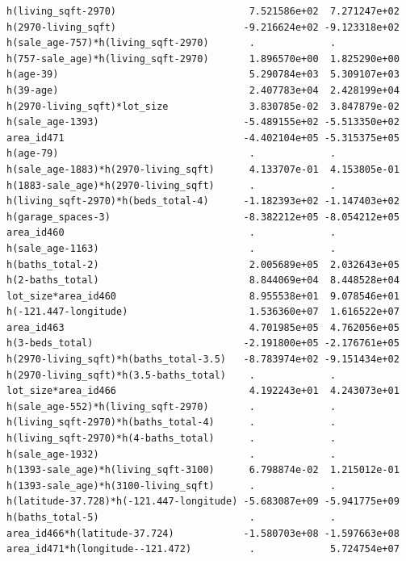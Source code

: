 \documentclass[
]{article}
\begin{document}
\begin{verbatim}
h(living_sqft-2970)                       7.521586e+02  7.271247e+02
h(2970-living_sqft)                      -9.216624e+02 -9.123318e+02
h(sale_age-757)*h(living_sqft-2970)       .             .           
h(757-sale_age)*h(living_sqft-2970)       1.896570e+00  1.825290e+00
h(age-39)                                 5.290784e+03  5.309107e+03
h(39-age)                                 2.407783e+04  2.428199e+04
h(2970-living_sqft)*lot_size              3.830785e-02  3.847879e-02
h(sale_age-1393)                         -5.489155e+02 -5.513350e+02
area_id471                               -4.402104e+05 -5.315375e+05
h(age-79)                                 .             .           
h(sale_age-1883)*h(2970-living_sqft)      4.133707e-01  4.153805e-01
h(1883-sale_age)*h(2970-living_sqft)      .             .           
h(living_sqft-2970)*h(beds_total-4)      -1.182393e+02 -1.147403e+02
h(garage_spaces-3)                       -8.382212e+05 -8.054212e+05
area_id460                                .             .           
h(sale_age-1163)                          .             .           
h(baths_total-2)                          2.005689e+05  2.032643e+05
h(2-baths_total)                          8.844069e+04  8.448528e+04
lot_size*area_id460                       8.955538e+01  9.078546e+01
h(-121.447-longitude)                     1.536360e+07  1.616522e+07
area_id463                                4.701985e+05  4.762056e+05
h(3-beds_total)                          -2.191800e+05 -2.176761e+05
h(2970-living_sqft)*h(baths_total-3.5)   -8.783974e+02 -9.151434e+02
h(2970-living_sqft)*h(3.5-baths_total)    .             .           
lot_size*area_id466                       4.192243e+01  4.243073e+01
h(sale_age-552)*h(living_sqft-2970)       .             .           
h(living_sqft-2970)*h(baths_total-4)      .             .           
h(living_sqft-2970)*h(4-baths_total)      .             .           
h(sale_age-1932)                          .             .           
h(1393-sale_age)*h(living_sqft-3100)      6.798874e-02  1.215012e-01
h(1393-sale_age)*h(3100-living_sqft)      .             .           
h(latitude-37.728)*h(-121.447-longitude) -5.683087e+09 -5.941775e+09
h(baths_total-5)                          .             .           
area_id466*h(latitude-37.724)            -1.580703e+08 -1.597663e+08
area_id471*h(longitude--121.472)          .             5.724754e+07
                                                                    

\end{verbatim}
\end{document}
